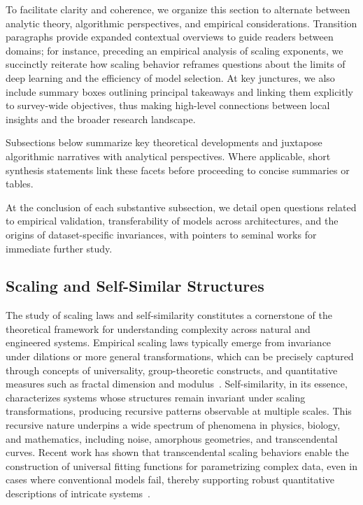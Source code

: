 \documentclass[sigconf]{acmart}
\begin{document}
To facilitate clarity and coherence, we organize this section to alternate between analytic theory, algorithmic perspectives, and empirical considerations. Transition paragraphs provide expanded contextual overviews to guide readers between domains; for instance, preceding an empirical analysis of scaling exponents, we succinctly reiterate how scaling behavior reframes questions about the limits of deep learning and the efficiency of model selection. At key junctures, we also include summary boxes outlining principal takeaways and linking them explicitly to survey-wide objectives, thus making high-level connections between local insights and the broader research landscape.

Subsections below summarize key theoretical developments and juxtapose algorithmic narratives with analytical perspectives. Where applicable, short synthesis statements link these facets before proceeding to concise summaries or tables. 

At the conclusion of each substantive subsection, we detail open questions related to empirical validation, transferability of models across architectures, and the origins of dataset-specific invariances, with pointers to seminal works for immediate further study.


\subsection{Scaling and Self-Similar Structures}

The study of scaling laws and self-similarity constitutes a cornerstone of the theoretical framework for understanding complexity across natural and engineered systems. Empirical scaling laws typically emerge from invariance under dilations or more general transformations, which can be precisely captured through concepts of universality, group-theoretic constructs, and quantitative measures such as fractal dimension and modulus~\cite{ref56,ref63}. Self-similarity, in its essence, characterizes systems whose structures remain invariant under scaling transformations, producing recursive patterns observable at multiple scales. This recursive nature underpins a wide spectrum of phenomena in physics, biology, and mathematics, including noise, amorphous geometries, and transcendental curves. Recent work has shown that transcendental scaling behaviors enable the construction of universal fitting functions for parametrizing complex data, even in cases where conventional models fail, thereby supporting robust quantitative descriptions of intricate systems~\cite{ref56,ref63}.
\end{document}
